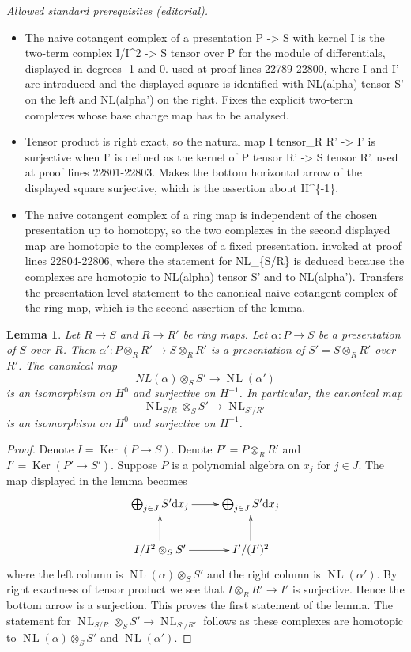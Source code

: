 \documentclass[10pt,a4paper]{amsart}
\theoremstyle{plain}
\newtheorem{lemma}[subsection]{Lemma}
\theoremstyle{definition}
\theoremstyle{remark}
\numberwithin{equation}{subsection}
\def\NL{\mathop{N\!L}\nolimits}
\def\Ker{\mathop{\mathrm{Ker}}}
\begin{document}
\noindent\textit{Allowed standard prerequisites (editorial).}\begin{itemize}
\item The naive cotangent complex of a presentation P -> S with kernel I is the two-term complex I/I\textasciicircum{}2 -> S tensor over P for the module of differentials, displayed in degrees -1 and 0. used at proof lines 22789-22800, where I and I' are introduced and the displayed square is identified with NL(alpha) tensor S' on the left and NL(alpha') on the right. Fixes the explicit two-term complexes whose base change map has to be analysed.
\item Tensor product is right exact, so the natural map I tensor\_R R' -> I' is surjective when I' is defined as the kernel of P tensor R' -> S tensor R'. used at proof lines 22801-22803. Makes the bottom horizontal arrow of the displayed square surjective, which is the assertion about H\textasciicircum{}\{-1\}.
\item The naive cotangent complex of a ring map is independent of the chosen presentation up to homotopy, so the two complexes in the second displayed map are homotopic to the complexes of a fixed presentation. invoked at proof lines 22804-22806, where the statement for NL\_\{S/R\} is deduced because the complexes are homotopic to NL(alpha) tensor S' and to NL(alpha'). Transfers the presentation-level statement to the canonical naive cotangent complex of the ring map, which is the second assertion of the lemma.
\end{itemize}\medskip
\begin{lemma}
\label{lemma-base-change-NL}
Let $R \to S$ and $R \to R'$ be ring maps.
Let $\alpha : P \to S$ be a presentation of $S$ over $R$.
Then $\alpha' : P \otimes_R R' \to S \otimes_R R'$ is a
presentation of $S' = S \otimes_R R'$ over $R'$.
The canonical map
$$
NL(\alpha) \otimes_S S' \to \NL(\alpha')
$$
is an isomorphism on $H^0$ and surjective on $H^{-1}$. In particular,
the canonical map
$$
\NL_{S/R} \otimes_S S' \to \NL_{S'/R'}
$$
is an isomorphism on $H^0$ and surjective on $H^{-1}$.
\end{lemma}

\begin{proof}
Denote $I = \Ker(P \to S)$. Denote $P' = P \otimes_R R'$ and
$I' = \Ker(P' \to S')$. Suppose $P$ is a polynomial algebra
on $x_j$ for $j \in J$. The map displayed in the lemma becomes
$$
\xymatrix{
\bigoplus_{j \in J} S' \text{d}x_j \ar[r] &
\bigoplus_{j \in J} S' \text{d}x_j \\
I/I^2 \otimes_S S' \ar[r] \ar[u] &
I'/(I')^2 \ar[u]
}
$$
where the left column is $\NL(\alpha) \otimes_S S'$ and the right
column is $\NL(\alpha')$. By right exactness of tensor product we
see that $I \otimes_R R' \to I'$ is surjective. Hence the bottom arrow
is a surjection. This proves the first statement of the lemma.
The statement for $\NL_{S/R} \otimes_S S' \to \NL_{S'/R'}$
follows as these complexes are homotopic to $\NL(\alpha) \otimes_S S'$ and
$\NL(\alpha')$.
\end{proof}
\end{document}
